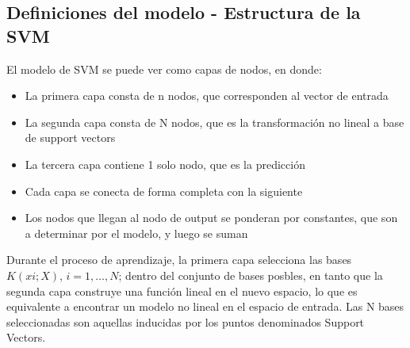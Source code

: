 \subsection{Definiciones del modelo - Estructura de la SVM}
	El modelo de SVM se puede ver como capas de nodos, en donde: \\
	\begin{itemize}
		\item La primera capa consta de n nodos, que corresponden al vector de entrada 
		\item La segunda capa consta de N nodos, que es la transformaci\'on no lineal a base de support vectors 
		\item La tercera capa contiene 1 solo nodo, que es la predicci\'on 
		\item Cada capa se conecta de forma completa con la siguiente 
		\item Los nodos que llegan al nodo de output se ponderan por constantes, que son a determinar por el modelo, y luego se suman 
	\end{itemize}    
	
	
	Durante el proceso de aprendizaje, la primera capa selecciona las bases $K(xi; X)$, $i = 1, \dots, N$; dentro del conjunto de bases posbles, en tanto que la segunda capa construye una funci\'on lineal en el nuevo espacio, lo que es equivalente a encontrar un modelo no lineal en el espacio de entrada. Las N bases seleccionadas son aquellas inducidas por los puntos denominados Support Vectors. 
	
